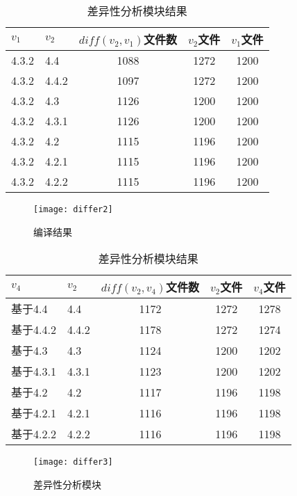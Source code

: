 \begin{table}[H]
	\caption{差异性分析模块结果}
	\label{data_differ_2}
	\centering
	\begin{tabular}{llccc}
		\toprule[1.5pt]
		{\heiti $v_1$} & {\heiti $v_2$} & {\heiti $diff(v_2,v_1)$文件数} & {\heiti $v_2$文件} & {\heiti $v_1$文件} \\\midrule[1pt]
		4.3.2 & 4.4	& 1088 & 1272 & 1200\\		
		4.3.2 & 4.4.2 & 1097 & 1272	& 1200	\\
		4.3.2 & 4.3 	 & 1126 & 1200	& 1200		\\
		4.3.2 & 4.3.1  & 1126 & 1200 & 1200			\\
		4.3.2 & 4.2 	& 1115 & 1196 & 1200		\\
		4.3.2 & 4.2.1 & 1115 & 1196 & 1200		\\
		4.3.2 & 4.2.2  & 1115 & 1196 & 1200		\\
		\bottomrule[1.5pt]
	\end{tabular}
\end{table}

\begin{figure}[H]
	\centering
	\texttt{[image: differ2]}
	\caption {编译结果}
	\label {差异性分析模块}	
\end{figure}

\begin{table}[H]
	\caption{差异性分析模块结果}
	\label{data_differ_3}
	\centering
	\begin{tabular}{llccc}
		\toprule[1.5pt]
		{\heiti $v_4$} & {\heiti $v_2$} & {\heiti $diff(v_2,v_4)$文件数} & {\heiti $v_2$文件} & {\heiti $v_4$文件} \\\midrule[1pt]
		基于4.4 & 4.4	& 1172 & 1272 &	1278\\		
		基于4.4.2 & 4.4.2 & 1178 & 1272 & 1274		\\
		基于4.3 & 4.3 	 & 1124 & 1200	& 1202		\\
		基于4.3.1 & 4.3.1  & 1123 & 1200	& 1202		\\
		基于4.2 & 4.2 	& 1117 & 1196 & 1198		\\
		基于4.2.1 & 4.2.1 & 1116 & 1196	& 1198		\\
		基于4.2.2 & 4.2.2  & 1116 & 1196 & 1198		\\
		\bottomrule[1.5pt]
	\end{tabular}
\end{table}

\begin{figure}[H]
	\centering
	\texttt{[image: differ3]}
	\caption {差异性分析模块}
	\label {differ3}	
\end{figure}

